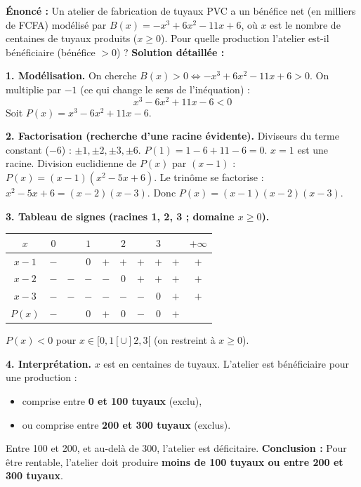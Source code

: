 \documentclass[11pt]{article}
\begin{document}
\begin{exoresolu}
\textbf{Énoncé :} Un atelier de fabrication de tuyaux PVC a un bénéfice net (en milliers de FCFA) modélisé par $B(x) = -x^3 + 6x^2 - 11x + 6$, où $x$ est le nombre de centaines de tuyaux produits ($x \ge 0$). Pour quelle production l'atelier est-il bénéficiaire (bénéfice $> 0$) ?
\tcblower
\textbf{Solution détaillée :}

\noindent\textbf{1. Modélisation.}
On cherche $B(x) > 0 \iff -x^3 + 6x^2 - 11x + 6 > 0$.
On multiplie par $-1$ (ce qui change le sens de l'inéquation) :
\[
x^3 - 6x^2 + 11x - 6 < 0
\]
Soit $P(x) = x^3 - 6x^2 + 11x - 6$.

\noindent\textbf{2. Factorisation (recherche d'une racine évidente).}
Diviseurs du terme constant ($-6$) : $\pm 1, \pm 2, \pm 3, \pm 6$.
$P(1) = 1 - 6 + 11 - 6 = 0$. \quad $x=1$ est une racine.
Division euclidienne de $P(x)$ par $(x-1)$ :
$P(x) = (x-1)(x^2 - 5x + 6)$.
Le trinôme se factorise : $x^2 - 5x + 6 = (x-2)(x-3)$.
Donc $P(x) = (x-1)(x-2)(x-3)$.

\noindent\textbf{3. Tableau de signes (racines 1, 2, 3 ; domaine $x \ge 0$).}
\begin{center}
\begin{tabular}{|c|ccccccccc|}\hline
$x$ & $0$ & & $1$ & & $2$ & & $3$ & & $+\infty$ \\ \hline
$x-1$ & $-$ & & $0$ & $+$ & $+$ & $+$ & $+$ & $+$ & $+$ \\
$x-2$ & $-$ & $-$ & $-$ & $-$ & $0$ & $+$ & $+$ & $+$ & $+$ \\
$x-3$ & $-$ & $-$ & $-$ & $-$ & $-$ & $-$ & $0$ & $+$ & $+$ \\ \hline
$P(x)$ & $-$ & & $0$ & $+$ & $0$ & $-$ & $0$ & $+$ & \\ \hline
\end{tabular}
\end{center}
$P(x) < 0$ pour $x \in [0, 1[ \cup ]2, 3[$ (on restreint à $x \ge 0$).

\noindent\textbf{4. Interprétation.}
$x$ est en centaines de tuyaux.
L'atelier est bénéficiaire pour une production :
\begin{itemize}
    \item comprise entre \textbf{0 et 100 tuyaux} (exclu),
    \item ou comprise entre \textbf{200 et 300 tuyaux} (exclus).
\end{itemize}
Entre 100 et 200, et au-delà de 300, l'atelier est déficitaire.
\textbf{Conclusion :} Pour être rentable, l'atelier doit produire \textbf{moins de 100 tuyaux ou entre 200 et 300 tuyaux}.
\end{exoresolu}
\end{document}
